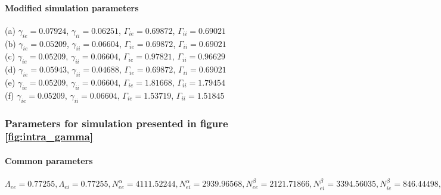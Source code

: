 \documentclass[a4paper,12pt]{article}
\begin{document}
\paragraph{Modified simulation parameters}
(a) $\gamma_{ie} = 0.07924$, $\gamma_{ii} = 0.06251$, $\Gamma_{ie} = 0.69872$, $\Gamma_{ii} = 0.69021$\\
(b) $\gamma_{ie} = 0.05209$, $\gamma_{ii} = 0.06604$, $\Gamma_{ie} = 0.69872$, $\Gamma_{ii} = 0.69021$\\
(c) $\gamma_{ie} = 0.05209$, $\gamma_{ii} = 0.06604$, $\Gamma_{ie} = 0.97821$, $\Gamma_{ii} = 0.96629$\\
(d) $\gamma_{ie} = 0.05943$, $\gamma_{ii} = 0.04688$, $\Gamma_{ie} = 0.69872$, $\Gamma_{ii} = 0.69021$\\
(e) $\gamma_{ie} = 0.05209$, $\gamma_{ii} = 0.06604$, $\Gamma_{ie} = 1.81668$, $\Gamma_{ii} = 1.79454$\\
(f) $\gamma_{ie} = 0.05209$, $\gamma_{ii} = 0.06604$, $\Gamma_{ie} = 1.53719$, $\Gamma_{ii} = 1.51845$\\



\subsubsection{Parameters for simulation presented in figure \ref{fig:intra_gamma}}
\paragraph{Common parameters}
$\Lambda_{ee} = 0.77255, \Lambda_{ei} = 0.77255, N^{\alpha}_{ee} = 4111.52244, N^{\alpha}_{ei} = 2939.96568,
N^{\beta}_{ee} = 2121.71866, N^{\beta}_{ei} = 3394.56035, N^{\beta}_{ie} =  846.44498, N^{\beta}_{ii} = 178.04925,
\hat{\Gamma}_{ee} =  0.10367, \hat{\Gamma}_{ei} = 1.21771, 
\chi_{ee} = 420.196, \chi_{ei} = 420.196, \gamma_{ee} = 0.07383,
\gamma_{ei} = 0.82956, h_e^{rest} = -68.11516,
h_{ee}^{eq} = -6.87622, h_{ei}^{eq} = -10.85385, h_i^{rest} = -79.2805, h_{ie}^{eq} = -78.14073,
h_{ii}^{eq} = -89.33821, \mu_e = -45.58067, \mu_i = -46.22321,
p_{ee} = 3.12714, p_{ei} = 5.15692,
p_{ie} = 0.0, p_{ii}: 0.0, \phi_{ie} = 0, \phi_{ii} = 0, S_e^{max} = 0.11240, S_i^{max} = 0.17063,
\sigma_e = 3.61819399, \sigma_i = 3.12887627, \tau_e = 21.0098, \tau_i = 77.73, 
\tau^{slow}_{ee} = 420.196, \tau^{slow}_{ei} = 420.196, v_{ee} = 0.96791, v_{ei} = 0.96791$
\end{document}
